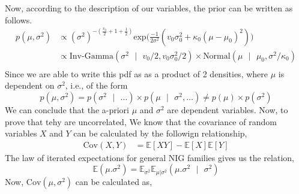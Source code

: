 \documentclass[11pt]{article}
\begin{document}
Now, according to the description of our variables, the prior can be written as follows.
\begin{equation}
  \nonumber
  \begin{aligned}
    p(\mu, \sigma^2)& \propto (\sigma^{2})^{-(\frac{v_{0}}{2} + 1 + \frac{1}{2})}\text{exp}\bigg(\frac{-1}{2\sigma^2}(v_{0}\sigma_{0}^{2} + \kappa_{0}(\mu - \mu_{0})^2)\bigg)\\
    & \propto \text{Inv-Gamma}(\sigma^{2} \text{ } | \text{ } v_{0}/2, v_{0}\sigma_{0}^2/2)\times \text{Normal}(\mu \text{ }|\text{ } \mu_{0}, \sigma^2/\kappa_{0})\\
  \end{aligned}
\end{equation}
Since we are able to write this pdf as as a product of 2 densities, where $\mu$ is dependent on $\sigma^{2}$, i.e., of the form
\begin{equation}
  \nonumber
  p(\mu, \sigma^{2}) = p(\sigma^{2} \text{ } | \text{ } \dots) \times p(\mu \text{ } | \text{ } \sigma^{2}, \dots) \neq p(\mu) \times p(\sigma^{2})
\end{equation}
We can conclude that the a-priori $\mu$ and $\sigma^{2}$ are dependent variables. Now, to prove that tehy are uncorrelated, We know that the covariance of random variables $X$ and $Y$ can be calculated by the followign relationship,
\begin{equation}
  \nonumber
  \begin{aligned}
    \text{Cov}(X, Y) & = \mathbb{E}[XY] - \mathbb{E}[X]\mathbb{E}[Y]
  \end{aligned}
\end{equation}
The law of iterated expectations for general NIG families gives us the relation,
\begin{equation}
  \mathbb{E}(\mu.\sigma^{2}) = \mathbb{E}_{\sigma^{2}}\mathbb{E}_{\mu | \sigma^{2}}(\mu.\sigma^{2}\text{ }|\text{ } \sigma^{2})
\end{equation}
Now, $\text{Cov}(\mu, \sigma^{2})$ can be calculated as,
\end{document}
